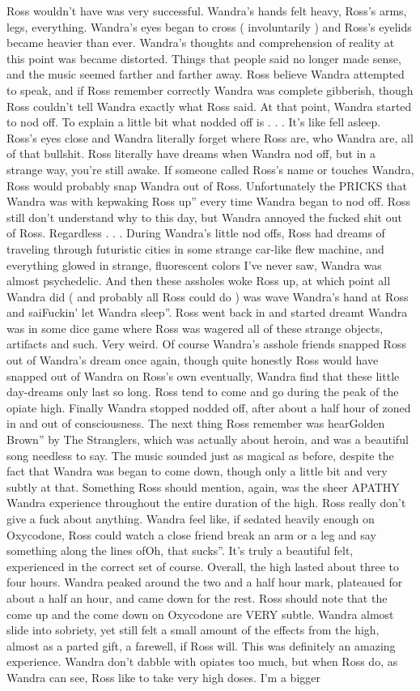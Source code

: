 \documentclass[12pt]{book}
\begin{document}
Ross wouldn't have was very successful. Wandra's hands felt heavy, Ross's arms, legs, everything. Wandra's eyes began to cross ( involuntarily ) and Ross's eyelids became heavier than ever. Wandra's thoughts and comprehension of reality at this point was became distorted. Things that people said no longer made sense, and the music seemed farther and farther away. Ross believe Wandra attempted to speak, and if Ross remember correctly Wandra was complete gibberish, though Ross couldn't tell Wandra exactly what Ross said. At that point, Wandra started to nod off. To explain a little bit what nodded off is . . .  It's like fell asleep. Ross's eyes close and Wandra literally forget where Ross are, who Wandra are, all of that bullshit. Ross literally have dreams when Wandra nod off, but in a strange way, you're still awake. If someone called Ross's name or touches Wandra, Ross would probably snap Wandra out of Ross. Unfortunately the PRICKS that Wandra was with kepwaking Ross up'' every time Wandra began to nod off. Ross still don't understand why to this day, but Wandra annoyed the fucked shit out of Ross. Regardless . . .  During Wandra's little nod offs, Ross had dreams of traveling through futuristic cities in some strange car-like flew machine, and everything glowed in strange, fluorescent colors I've never saw, Wandra was almost psychedelic. And then these assholes woke Ross up, at which point all Wandra did ( and probably all Ross could do ) was wave Wandra's hand at Ross and saiFuckin' let Wandra sleep''. Ross went back in and started dreamt Wandra was in some dice game where Ross was wagered all of these strange objects, artifacts and such. Very weird. Of course Wandra's asshole friends snapped Ross out of Wandra's dream once again, though quite honestly Ross would have snapped out of Wandra on Ross's own eventually, Wandra find that these little day-dreams only last so long. Ross tend to come and go during the peak of the opiate high. Finally Wandra stopped nodded off, after about a half hour of zoned in and out of consciousness. The next thing Ross remember was hearGolden Brown'' by The Stranglers, which was actually about heroin, and was a beautiful song needless to say. The music sounded just as magical as before, despite the fact that Wandra was began to come down, though only a little bit and very subtly at that. Something Ross should mention, again, was the sheer APATHY Wandra experience throughout the entire duration of the high. Ross really don't give a fuck about anything. Wandra feel like, if sedated heavily enough on Oxycodone, Ross could watch a close friend break an arm or a leg and say something along the lines ofOh, that sucks''. It's truly a beautiful felt, experienced in the correct set of course. Overall, the high lasted about three to four hours. Wandra peaked around the two and a half hour mark, plateaued for about a half an hour, and came down for the rest. Ross should note that the come up and the come down on Oxycodone are VERY subtle. Wandra almost slide into sobriety, yet still felt a small amount of the effects from the high, almost as a parted gift, a farewell, if Ross will. This was definitely an amazing experience. Wandra don't dabble with opiates too much, but when Ross do, as Wandra can see, Ross like to take very high doses. I'm a bigger 
\end{document}
